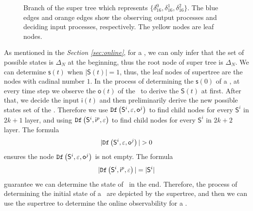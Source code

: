   \begin{figure}[thpb]
      \centering
      
      \caption{Branch of the super tree which represents $\{\delta_{16}^0,\delta_{16}^1,\delta_{16}^2\}$. The blue edges and orange edges show the observing output processes and deciding input processes, respectively. The yellow nodes are leaf nodes.}
      \label{fig:3}
   \end{figure}

As mentioned in the {\em Section \ref{sec:online}}, for a \BCN, we can only infer that the set of possible states is $\Delta_N$ at the beginning, thus the root node of super tree is $\Delta_N$. We can determine $\mathsf{s}(t)$ when $|\mathsf{S}(t)|=1$, thus, the leaf nodes of supertree are the nodes with cadinal number $1$. In the process of determining the $\mathsf{s}(0)$ of a \BCN, at every time step we observe the $\mathsf{o}(t)$ of the \BCN\ to derive the $\mathsf{S}(t)$ at first. After that, we decide the input $\mathsf{i}(t)$ and then preliminarily derive the new possible states set of the \BCN. Therefore we use ${\tt Df}\left(\mathsf{S}^i,\varepsilon, \mathsf{o}^j\right)$ to find child nodes for every $\mathsf{S}^i$ in $2k+1$ layer, and using ${\tt Df}\left(\mathsf{S}^i,\mathsf{i}^p,\varepsilon\right)$ to find child nodes for every $\mathsf{S}^i$ in $2k+2$ layer. The formula 
\[|\Ded\left(\mathsf{S}^i,\varepsilon, \mathsf{o}^j\right)|>0\]
 ensures the node ${\tt Df}\left(\mathsf{S}^i,\varepsilon, \mathsf{o}^j\right)$ is not empty. The formula 
 \[|{\tt Df}\left(\mathsf{S}^i,\mathsf{i}^p,\varepsilon\right)|=|\mathsf{S}^i|\] 
 guarantee we can determine the state of \BCN\ in the end. Therefore, the process of determining the initial state of a \BCN\ are depicted by the supertree, and then we can use the supertree to determine the online observability for a \BCN.

